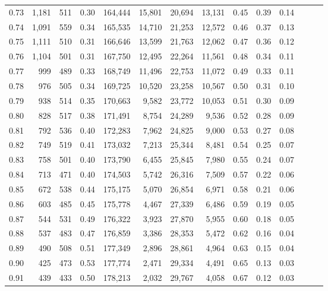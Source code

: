 \begin{tabular}{rrrrrrrrrrrrrr}
0.73 &  1,181 &  511 &  0.30 &  164,444 &   15,801 &  20,694 &  13,131 &  0.45 &  0.39 &      0.14 \\
0.74 &  1,091 &  559 &  0.34 &  165,535 &   14,710 &  21,253 &  12,572 &  0.46 &  0.37 &      0.13 \\
0.75 &  1,111 &  510 &  0.31 &  166,646 &   13,599 &  21,763 &  12,062 &  0.47 &  0.36 &      0.12 \\
0.76 &  1,104 &  501 &  0.31 &  167,750 &   12,495 &  22,264 &  11,561 &  0.48 &  0.34 &      0.11 \\
0.77 &    999 &  489 &  0.33 &  168,749 &   11,496 &  22,753 &  11,072 &  0.49 &  0.33 &      0.11 \\
0.78 &    976 &  505 &  0.34 &  169,725 &   10,520 &  23,258 &  10,567 &  0.50 &  0.31 &      0.10 \\
0.79 &    938 &  514 &  0.35 &  170,663 &    9,582 &  23,772 &  10,053 &  0.51 &  0.30 &      0.09 \\
0.80 &    828 &  517 &  0.38 &  171,491 &    8,754 &  24,289 &   9,536 &  0.52 &  0.28 &      0.09 \\
0.81 &    792 &  536 &  0.40 &  172,283 &    7,962 &  24,825 &   9,000 &  0.53 &  0.27 &      0.08 \\
0.82 &    749 &  519 &  0.41 &  173,032 &    7,213 &  25,344 &   8,481 &  0.54 &  0.25 &      0.07 \\
0.83 &    758 &  501 &  0.40 &  173,790 &    6,455 &  25,845 &   7,980 &  0.55 &  0.24 &      0.07 \\
0.84 &    713 &  471 &  0.40 &  174,503 &    5,742 &  26,316 &   7,509 &  0.57 &  0.22 &      0.06 \\
0.85 &    672 &  538 &  0.44 &  175,175 &    5,070 &  26,854 &   6,971 &  0.58 &  0.21 &      0.06 \\
0.86 &    603 &  485 &  0.45 &  175,778 &    4,467 &  27,339 &   6,486 &  0.59 &  0.19 &      0.05 \\
0.87 &    544 &  531 &  0.49 &  176,322 &    3,923 &  27,870 &   5,955 &  0.60 &  0.18 &      0.05 \\
0.88 &    537 &  483 &  0.47 &  176,859 &    3,386 &  28,353 &   5,472 &  0.62 &  0.16 &      0.04 \\
0.89 &    490 &  508 &  0.51 &  177,349 &    2,896 &  28,861 &   4,964 &  0.63 &  0.15 &      0.04 \\
0.90 &    425 &  473 &  0.53 &  177,774 &    2,471 &  29,334 &   4,491 &  0.65 &  0.13 &      0.03 \\
0.91 &    439 &  433 &  0.50 &  178,213 &    2,032 &  29,767 &   4,058 &  0.67 &  0.12 &      0.03 \\

\end{tabular}
